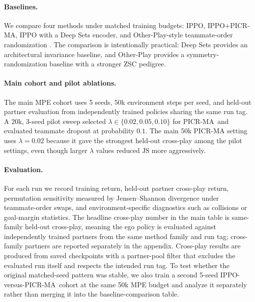\documentclass{article}
\newcommand{\method}{PICR-MA}
\newcommand{\JS}{\mathrm{JS}}
\begin{document}
\paragraph{Baselines.}
We compare four methods under matched training budgets: IPPO, IPPO+\method, IPPO with a Deep Sets encoder, and Other-Play-style teammate-order randomization \citep{schulman2017ppo, terry2020ps, zaheer2017deepsets, hu2020otherplay}. The comparison is intentionally practical: Deep Sets provides an architectural invariance baseline, and Other-Play provides a symmetry-randomization baseline with a stronger ZSC pedigree.

\paragraph{Main cohort and pilot ablations.}
The main MPE cohort uses 5 seeds, 50k environment steps per seed, and held-out partner evaluation from independently trained policies sharing the same run tag. A 20k, 3-seed pilot sweep selected $\lambda \in \{0.02, 0.05, 0.10\}$ for \method\ and evaluated teammate dropout at probability $0.1$. The main 50k PICR-MA setting uses $\lambda=0.02$ because it gave the strongest held-out cross-play among the pilot settings, even though larger $\lambda$ values reduced $\JS$ more aggressively.

\paragraph{Evaluation.}
For each run we record training return, held-out partner cross-play return, permutation sensitivity measured by Jensen--Shannon divergence under teammate-order swaps, and environment-specific diagnostics such as collisions or goal-margin statistics. The headline cross-play number in the main table is same-family held-out cross-play, meaning the ego policy is evaluated against independently trained partners from the same method family and run tag; cross-family partners are reported separately in the appendix. Cross-play results are produced from saved checkpoints with a partner-pool filter that excludes the evaluated run itself and respects the intended run tag. To test whether the original matched-seed pattern was stable, we also train a second 5-seed IPPO-versus-\method\ cohort at the same 50k MPE budget and analyze it separately rather than merging it into the baseline-comparison table.
\end{document}
